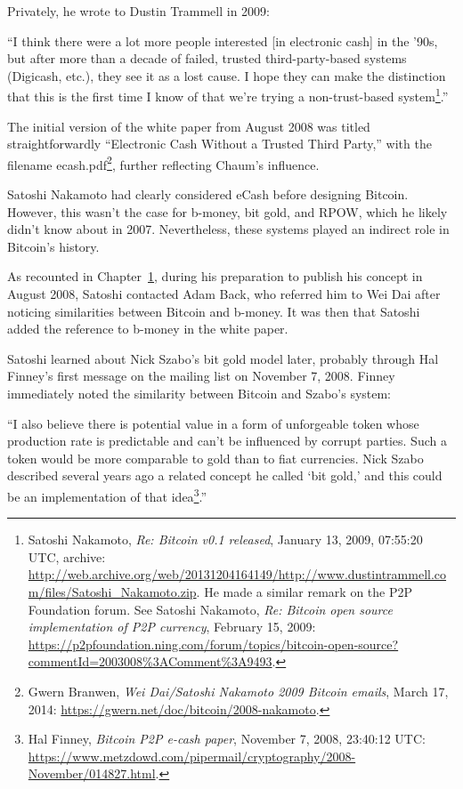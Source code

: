 \documentclass[
  a5paper,
  smalldemyvopaper,10pt,twoside,onecolumn,openright,extrafontsizes,hidelinks]{memoir}
\begin{document}
Privately, he wrote to Dustin Trammell in 2009:

``I think there were a lot more people interested {[}in electronic
cash{]} in the '90s, but after more than a decade of failed, trusted
third-party-based systems (Digicash, etc.), they see it as a lost cause.
I hope they can make the distinction that this is the first time I know
of that we're trying a non-trust-based system\footnote{Satoshi Nakamoto,
  \emph{Re: Bitcoin v0.1 released}, January 13, 2009, 07:55:20 UTC,
  archive:
  \url{http://web.archive.org/web/20131204164149/http://www.dustintrammell.com/files/Satoshi_Nakamoto.zip}.
  He made a similar remark on the P2P Foundation forum. See Satoshi
  Nakamoto, \emph{Re: Bitcoin open source implementation of P2P
  currency}, February 15, 2009:
  \url{https://p2pfoundation.ning.com/forum/topics/bitcoin-open-source?commentId=2003008\%3AComment\%3A9493}.}.''

The initial version of the white paper from August 2008 was titled
straightforwardly ``Electronic Cash Without a Trusted Third Party,''
with the filename ecash.pdf\footnote{Gwern Branwen, \emph{Wei
  Dai/Satoshi Nakamoto 2009 Bitcoin emails}, March 17, 2014:
  \url{https://gwern.net/doc/bitcoin/2008-nakamoto}.}, further
reflecting Chaum's influence.

Satoshi Nakamoto had clearly considered eCash before designing Bitcoin.
However, this wasn't the case for b-money, bit gold, and RPOW, which he
likely didn't know about in 2007. Nevertheless, these systems played an
indirect role in Bitcoin's history.

As recounted in Chapter~\hyperref[ch:myth]{1}, during his preparation to
publish his concept in August 2008, Satoshi contacted Adam Back, who
referred him to Wei Dai after noticing similarities between Bitcoin and
b-money. It was then that Satoshi added the reference to b-money in the
white paper.

Satoshi learned about Nick Szabo's bit gold model later, probably
through Hal Finney's first message on the mailing list on November 7,
2008. Finney immediately noted the similarity between Bitcoin and
Szabo's system:

``I also believe there is potential value in a form of unforgeable token
whose production rate is predictable and can't be influenced by corrupt
parties. Such a token would be more comparable to gold than to fiat
currencies. Nick Szabo described several years ago a related concept he
called `bit gold,' and this could be an implementation of that
idea\footnote{Hal Finney, \emph{Bitcoin P2P e-cash paper}, November 7,
  2008, 23:40:12 UTC:
  \url{https://www.metzdowd.com/pipermail/cryptography/2008-November/014827.html}.}.''
\end{document}
